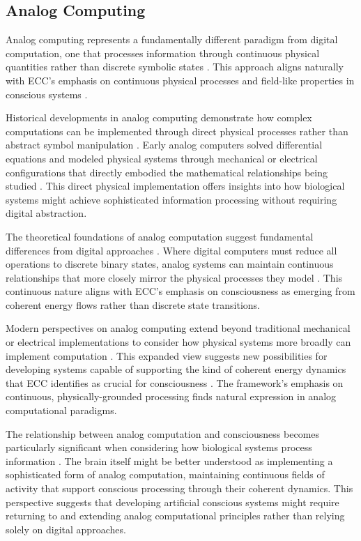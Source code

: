 \begin{refsection}
\section{Analog Computing}

Analog computing represents a fundamentally different paradigm from digital computation, one that processes information through continuous physical quantities rather than discrete symbolic states \cite{Shannon1941}. This approach aligns naturally with ECC's emphasis on continuous physical processes and field-like properties in conscious systems \cite{MacLennan2009}.

Historical developments in analog computing demonstrate how complex computations can be implemented through direct physical processes rather than abstract symbol manipulation \cite{Small2001}. Early analog computers solved differential equations and modeled physical systems through mechanical or electrical configurations that directly embodied the mathematical relationships being studied \cite{Bissell2004}. This direct physical implementation offers insights into how biological systems might achieve sophisticated information processing without requiring digital abstraction.

The theoretical foundations of analog computation suggest fundamental differences from digital approaches \cite{Moore1996}. Where digital computers must reduce all operations to discrete binary states, analog systems can maintain continuous relationships that more closely mirror the physical processes they model \cite{Vergis1986}. This continuous nature aligns with ECC's emphasis on consciousness as emerging from coherent energy flows rather than discrete state transitions.

Modern perspectives on analog computing extend beyond traditional mechanical or electrical implementations to consider how physical systems more broadly can implement computation \cite{Mills2008}. This expanded view suggests new possibilities for developing systems capable of supporting the kind of coherent energy dynamics that ECC identifies as crucial for consciousness \cite{Ulmann2013}. The framework's emphasis on continuous, physically-grounded processing finds natural expression in analog computational paradigms.

The relationship between analog computation and consciousness becomes particularly significant when considering how biological systems process information \cite{vonNeumann1963}. The brain itself might be better understood as implementing a sophisticated form of analog computation, maintaining continuous fields of activity that support conscious processing through their coherent dynamics. This perspective suggests that developing artificial conscious systems might require returning to and extending analog computational principles rather than relying solely on digital approaches.


\end{refsection}
